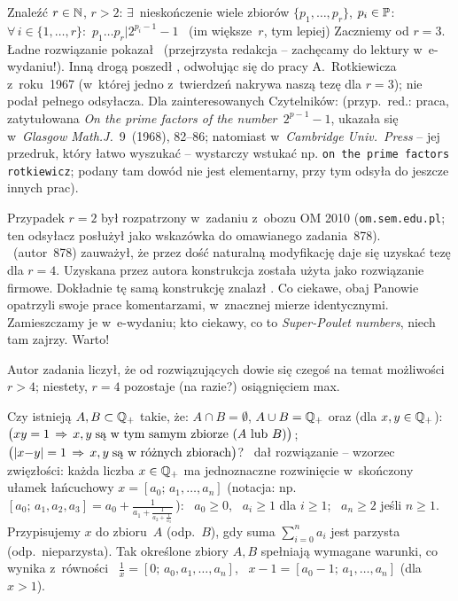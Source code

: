 {\begin{dwieszpalty}
{Znaleźć ${r\in\N}$, ${r>2}$: $\exists$~nieskończenie wiele zbiorów $\{p_1,\ldots,p_r\}$, ${p_i\in\P}$: ${\forall\,i\in\{1,\ldots,r\}\colon}$ ${p_1\ldots{p_r}|2^{p_i-1}-1}$ \ (im większe~$r$, tym lepiej)}
Zaczniemy od ${r=3}$. Ładne rozwiązanie pokazał \Ols\ (przejrzysta redakcja -- zachęcamy do lektury w~e-wydaniu!). Inną drogą poszedł \Wis, odwołując się do pracy A.~Rotkiewicza z~roku~1967 (w~której jedno z~twierdzeń nakrywa naszą tezę dla ${r=3}$); nie podał pełnego odsyłacza. Dla zainteresowanych Czytelników: (przyp.~red.: praca, zatytułowana {\it On the prime factors of the number~$2^{p-1}{-}1$}, ukazała się  w~{\it Glasgow Math.J.}~9~(1968), 82--86; natomiast w~{\it Cambridge Univ.~Press} -- jej przedruk, który łatwo wyszukać -- wystarczy wstukać np. {\tt on the prime factors rotkiewicz}; podany tam dowód nie jest elementarny, przy tym odsyła do jeszcze innych prac).

Przypadek ${r=2}$ był rozpatrzony w~zadaniu z~obozu OM 2010 ({\tt om.sem.edu.pl}; ten odsyłacz posłużył jako wskazówka do omawianego zadania~878). \Kum\ (autor~878) zauważył, że przez dość naturalną modyfikację daje się uzyskać tezę dla ${r=4}$. Uzyskana przez autora konstrukcja została użyta jako rozwiązanie firmowe. Dokładnie tę samą konstrukcję znalazł \Ada. Co ciekawe, obaj Panowie opatrzyli swoje prace komentarzami, w~znacznej mierze identycznymi. Zamieszczamy je w~e-wydaniu; kto ciekawy, co to {\it Super-Poulet numbers}, niech tam zajrzy. Warto!

Autor zadania liczył, że od rozwiązujących dowie się  czegoś na temat możliwości ${r>4}$; niestety, ${r=4}$  pozostaje (na razie?) osiągnięciem max.


{Czy istnieją ${A,B\subset\Q_+}$ takie, że: ${A\cap{B}=\emptyset}$, ${A\cup{B}=\Q_+}$ oraz (dla ${x,y\in\Q_+}$): ${\bigl(xy=1\,\Rightarrow\,x,y\;\hbox{są w~tym samym zbiorze ($A$~lub~$B$)}\bigr)}$; \
${\bigl(|x{-}y|=1\,\Rightarrow\,x,y\;\hbox{są w~różnych zbiorach}\bigr)}$?}
\Ada\ dał rozwiązanie -- wzorzec zwięzłości: każda liczba ${x\in\Q_+}$ ma jednoznaczne rozwinięcie w~skończony ułamek łańcuchowy ${x=[a_0;\,a_1,\ldots,a_n]}$ (notacja: np. ${[a_0;\,a_1,a_2,a_3]=a_0+\frac1{a_1+\frac1{a_2+\frac1{a_3}}}}\,$): \ ${a_0\ge0}$, \ ${a_i\ge1}$ dla ${i\ge1}$; \ ${a_n\ge2}$ jeśli ${n\ge1}$. Przypisujemy $x$ do zbioru~$A$ (odp.~$B$), gdy suma ${\sum_{i=0}^na_i}$ jest parzysta (odp.~nieparzysta). Tak określone zbiory $A,B$ spełniają wymagane warunki, co wynika z~równości \ ${\frac1x=[0;\,a_0,a_1,\ldots,a_n]}$, \ ${x-1=[a_0{-}1;\,a_1,\ldots,a_n]}$ (dla ${x>1}$).


\end{dwieszpalty}}
